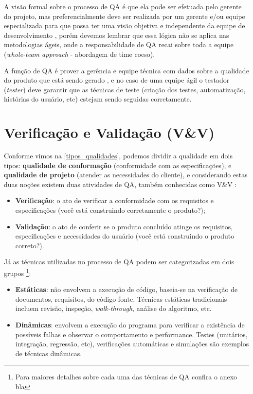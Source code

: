 \documentclass[
	12pt,				%
	openright,			%
	oneside,			%
	a4paper,			%
	english,			%
	brazil,				%
	]{abntex2}
\begin{document}
A visão formal sobre o processo de QA é que ela pode ser efetuada pelo gerente do projeto, mas preferencialmente deve ser realizada por um gerente e/ou equipe especializada para que possa ter uma visão objetiva e independente da equipe de desenvolvimento \cite{SOMMERVILLE2011,WAZLAWICK2013}, porém devemos lembrar que essa lógica não se aplica nas metodologias ágeis, onde a responsabilidade de QA recai sobre toda a equipe (\emph{whole-team approach} - abordagem de time coeso).

A função de QA é prover a gerência e equipe técnica com dados sobre a qualidade do produto que está sendo gerado \cite{SOMMERVILLE2011}, e no caso de uma equipe ágil o testador (\emph{tester}) deve garantir que as técnicas de teste (criação dos testes, automatização, histórias do usuário, etc) estejam sendo seguidas corretamente.

\section{Verificação e Validação (V\&V)}
Conforme vimos na \autoref{tipos_qualidades}, podemos dividir a qualidade em dois tipos: \textbf{qualidade de conformação} (conformidade com as especificações), e \textbf{qualidade de projeto} (atender as necessidades do cliente), e considerando estas duas noções existem duas atividades de QA, também conhecidas como V\&V \cite{tsui2013, PRESSMAN2010}:
\begin{itemize}
    \item \textbf{Verificação}: o ato de verificar a conformidade com os requisitos e especificações (você está construindo corretamente o produto?);
    \item \textbf{Validação}: o ato de conferir se o produto concluído atinge os requisitos, especificações e necessidades do usuário (você está construindo o produto correto?).
\end{itemize}

Já as técnicas utilizadas no processo de QA podem ser categorizadas em dois grupos \cite{Huo:2004:SQA:1025117.1025549,Naik2011}\footnote{Para maiores detalhes sobre cada uma das técnicas de QA confira o anexo bla}: %

\begin{itemize}
    \item \textbf{Estáticas}: não envolvem a execução de código, baseia-se na verificação de documentos, requisitos, do código-fonte. Técnicas estáticas tradicionais incluem revisão, inspeção, \emph{walk-through}, análise do algoritmo, etc.
    \item \textbf{Dinâmicas}: envolvem a execução do programa para verificar a existência de possíveis falhas e observar o comportamento e performance. Testes (unitários, integração, regressão, etc), verificações automáticas e simulações são exemplos de técnicas dinâmicas.
\end{itemize}
\end{document}
